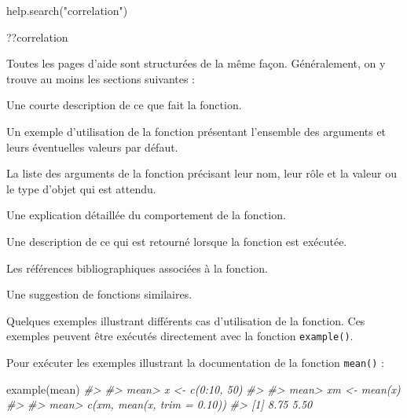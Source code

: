 \documentclass[
  french,
]{scrbook}
\newenvironment{Shaded}{\begin{snugshade}}{\end{snugshade}}
\newcommand{\CommentTok}[1]{\textcolor[rgb]{0.56,0.35,0.01}{\textit{#1}}}
\newcommand{\FunctionTok}[1]{\textcolor[rgb]{0.00,0.00,0.00}{#1}}
\newcommand{\NormalTok}[1]{#1}
\newcommand{\StringTok}[1]{\textcolor[rgb]{0.31,0.60,0.02}{#1}}
\providecommand{\tightlist}{%
  \setlength{\itemsep}{0pt}\setlength{\parskip}{0pt}}
\begin{document}
\begin{Shaded}
\begin{Highlighting}[]
\FunctionTok{help.search}\NormalTok{(}\StringTok{"correlation"}\NormalTok{)}

\NormalTok{??correlation}
\end{Highlighting}
\end{Shaded}

Toutes les pages d'aide sont structurées de la même façon. Généralement, on y trouve au moins les sections suivantes :

\begin{description}
\tightlist
\item[\emph{Description}]
Une courte description de ce que fait la fonction.
\item[\emph{Usage}]
Un exemple d'utilisation de la fonction présentant l'ensemble des arguments et leurs éventuelles valeurs par défaut.
\item[\emph{Arguments}]
La liste des arguments de la fonction précisant leur nom, leur rôle et la valeur ou le type d'objet qui est attendu.
\item[\emph{Details}]
Une explication détaillée du comportement de la fonction.
\item[\emph{Value}]
Une description de ce qui est retourné lorsque la fonction est exécutée.
\item[\emph{References}]
Les références bibliographiques associées à la fonction.
\item[\emph{See Also}]
Une suggestion de fonctions similaires.
\item[\emph{Examples}]
Quelques exemples illustrant différents cas d'utilisation de la fonction. Ces exemples peuvent être exécutés directement avec la fonction \texttt{example()}.
\end{description}

Pour exécuter les exemples illustrant la documentation de la fonction \texttt{mean()} :

\begin{Shaded}
\begin{Highlighting}[]
\FunctionTok{example}\NormalTok{(mean)}
\CommentTok{\#\textgreater{} }
\CommentTok{\#\textgreater{} mean\textgreater{} x \textless{}{-} c(0:10, 50)}
\CommentTok{\#\textgreater{} }
\CommentTok{\#\textgreater{} mean\textgreater{} xm \textless{}{-} mean(x)}
\CommentTok{\#\textgreater{} }
\CommentTok{\#\textgreater{} mean\textgreater{} c(xm, mean(x, trim = 0.10))}
\CommentTok{\#\textgreater{} [1] 8.75 5.50}
\end{Highlighting}
\end{Shaded}
\end{document}
